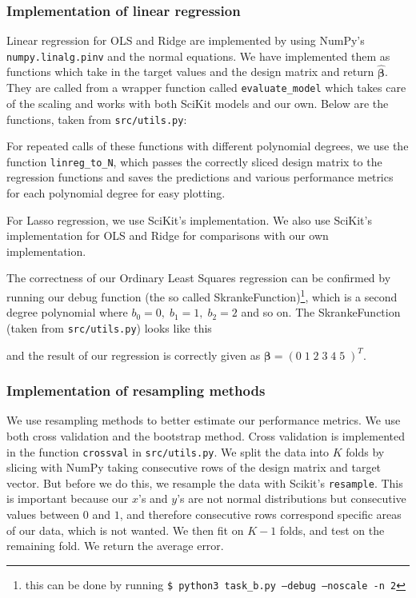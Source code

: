\documentclass[twocolumn,10pt,cleanfoot]{asme2ej}
\begin{document}

\subsubsection{Implementation of linear regression}

Linear regression for OLS and Ridge are implemented by using NumPy's \texttt{numpy.linalg.pinv} and the normal equations. We have implemented them as functions which take in the target values and the design matrix and return $\bm{\hat{\beta}}$. They are called from a wrapper function called \texttt{evaluate\_model} which takes care of the scaling and works with both SciKit models and our own. Below are the functions, taken from \texttt{src/utils.py}:



For repeated calls of these functions with different polynomial degrees, we use the function \texttt{linreg\_to\_N}, which passes the correctly sliced design matrix to the regression functions and saves the predictions and various performance metrics for each polynomial degree for easy plotting.

For Lasso regression, we use SciKit's implementation. We also use SciKit's implementation for OLS and Ridge for comparisons with our own implementation.

The correctness of our Ordinary Least Squares regression can be confirmed by running our debug function (the so called SkrankeFunction)\footnote{this can be done by running \texttt{\$ python3 task\_b.py --debug --noscale -n 2}}, which is a second degree polynomial where $b_0 = 0, \; b_1 = 1, \; b_2 = 2$ and so on. The SkrankeFunction (taken from \texttt{src/utils.py}) looks like this



and the result of our regression is correctly given as $\bm{\beta} = (0 \; 1 \; 2 \; 3 \; 4 \; 5\;)^T$.

\subsubsection{Implementation of resampling methods}

We use resampling methods to better estimate our performance metrics. We use both cross validation and the bootstrap method. Cross validation is implemented in the function \texttt{crossval} in \texttt{src/utils.py}. We split the data into $K$ folds by slicing with NumPy taking consecutive rows of the design matrix and target vector. But before we do this, we resample the data with Scikit's \texttt{resample}. This is important because our $x$'s and $y$'s are not normal distributions but consecutive values between $0$ and $1$, and therefore consecutive rows correspond specific areas of our data, which is not wanted. We then fit on $K-1$ folds, and test on the remaining fold. We return the average error.
\end{document}

